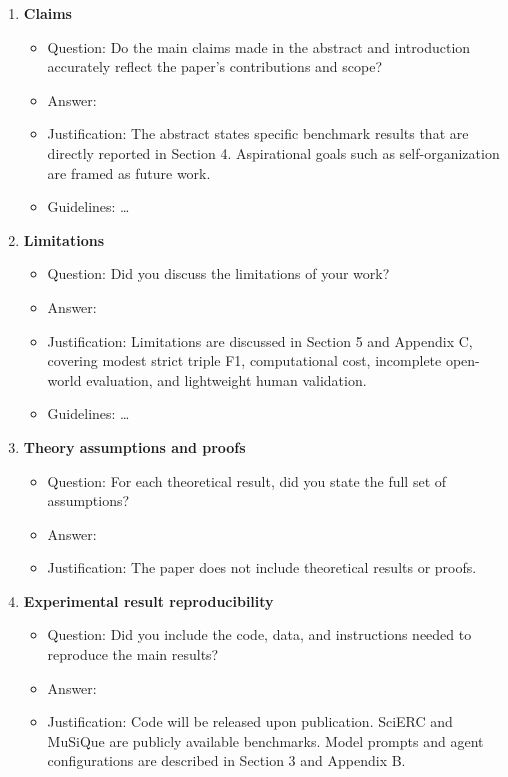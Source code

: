 \documentclass{article}
\begin{document}
\begin{enumerate}
\item {\bf Claims}
\begin{itemize}
\item[] Question: Do the main claims made in the abstract and introduction accurately reflect the paper's contributions and scope?
\item[] Answer: \answerYes{}
\item[] Justification: The abstract states specific benchmark results that are directly reported in Section 4. Aspirational goals such as self-organization are framed as future work.
\item[] Guidelines: \ldots
\end{itemize}

\item {\bf Limitations}
\begin{itemize}
\item[] Question: Did you discuss the limitations of your work?
\item[] Answer: \answerYes{}
\item[] Justification: Limitations are discussed in Section 5 and Appendix C, covering modest strict triple F1, computational cost, incomplete open-world evaluation, and lightweight human validation.
\item[] Guidelines: \ldots
\end{itemize}

\item {\bf Theory assumptions and proofs}
\begin{itemize}
\item[] Question: For each theoretical result, did you state the full set of assumptions?
\item[] Answer: \answerNA{}
\item[] Justification: The paper does not include theoretical results or proofs.
\end{itemize}

\item {\bf Experimental result reproducibility}
\begin{itemize}
\item[] Question: Did you include the code, data, and instructions needed to reproduce the main results?
\item[] Answer: \answerNo{}
\item[] Justification: Code will be released upon publication. SciERC and MuSiQue are publicly available benchmarks. Model prompts and agent configurations are described in Section 3 and Appendix B.
\end{itemize}


\end{enumerate}
\end{document}
